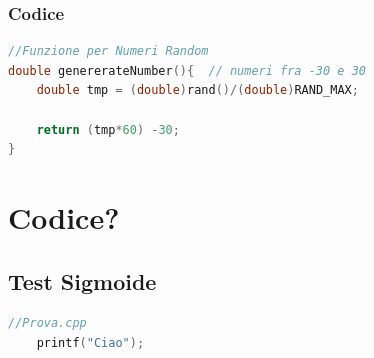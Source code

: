 \documentclass[a4paper,11pt]{article}
\begin{document}
\subsubsection{Codice}
\begin{lstlisting}[language=C++]
//Funzione per Numeri Random
double genererateNumber(){	// numeri fra -30 e 30
	double tmp = (double)rand()/(double)RAND_MAX;
	
	return (tmp*60) -30;
}


\end{lstlisting}


\section{Codice?}
\subsection{Test Sigmoide}
\begin{lstlisting}[language=C++]
	//Prova.cpp
	printf("Ciao");
	
	
\end{lstlisting}
	


\newpage

	\nocite{articolo1}
	
	\printbibliography[title=Bibliografia]

	
\end{document}
